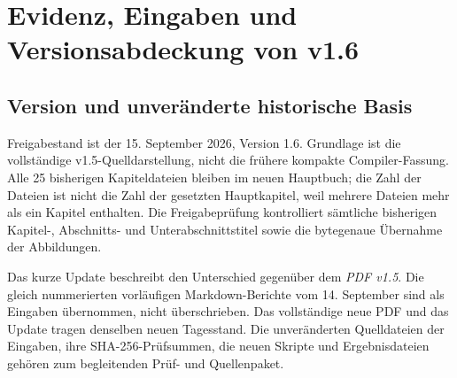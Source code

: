 \chapter{Evidenz, Eingaben und Versionsabdeckung von v1.6}
\label{app:v16-evidence}
\section{Version und unveränderte historische Basis}
Freigabestand ist der 15. September 2026, Version 1.6. Grundlage ist die vollständige v1.5-Quelldarstellung, nicht die frühere kompakte Compiler-Fassung. Alle 25 bisherigen Kapiteldateien bleiben im neuen Hauptbuch; die Zahl der Dateien ist nicht die Zahl der gesetzten Hauptkapitel, weil mehrere Dateien mehr als ein Kapitel enthalten. Die Freigabeprüfung kontrolliert sämtliche bisherigen Kapitel-, Abschnitts- und Unterabschnittstitel sowie die bytegenaue Übernahme der Abbildungen.

Das kurze Update beschreibt den Unterschied gegenüber dem \emph{PDF v1.5}. Die gleich nummerierten vorläufigen Markdown-Berichte vom 14. September sind als Eingaben übernommen, nicht überschrieben. Das vollständige neue PDF und das Update tragen denselben neuen Tagesstand. Die unveränderten Quelldateien der Eingaben, ihre SHA-256-Prüfsummen, die neuen Skripte und Ergebnisdateien gehören zum begleitenden Prüf- und Quellenpaket.


